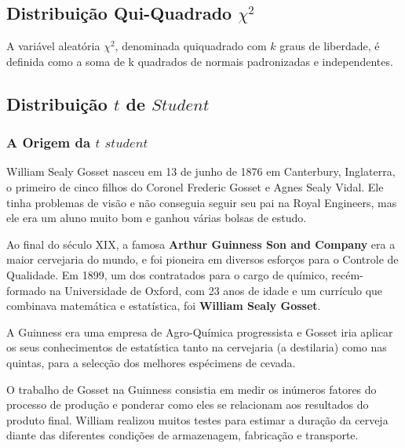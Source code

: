 \newpage
\subsection{Distribuição Qui-Quadrado $\chi^{2}$}

\inic A variável aleatória $\chi^{2}$, denominada quiquadrado com $k$ graus de liberdade, é definida como a soma de k quadrados de normais padronizadas e independentes. 


\newpage
\subsection{Distribuição $t$ de $Student$}
\subsubsection{A Origem da $t$ $student$}

William Sealy Gosset nasceu em 13 de junho de 1876 em Canterbury, Inglaterra, o primeiro de cinco filhos do Coronel Frederic Gosset e Agnes Sealy Vidal. Ele tinha problemas de visão e não conseguia seguir seu pai na Royal Engineers, mas ele era um aluno muito bom e ganhou várias bolsas de estudo.\vskip0.3cm


Ao final do século XIX, a famosa \textbf{Arthur Guinness Son and Company} era a maior cervejaria do mundo, e foi pioneira em diversos esforços para o Controle de Qualidade. Em 1899, um dos contratados para o cargo de químico, recém-formado na Universidade de Oxford, com 23 anos de idade e um currículo que combinava matemática e estatística, foi \textbf{William Sealy Gosset}.\vskip0.3cm



A Guinness era uma empresa de Agro-Química progressista e Gosset iria aplicar os seus conhecimentos de estatística tanto na cervejaria (a destilaria) como nas quintas, para a selecção dos melhores espécimens de cevada.\vskip0.3cm

O trabalho de Gosset na Guinness consistia em medir os inúmeros fatores do processo de produção e ponderar como eles se relacionam aos resultados do produto final. William realizou muitos testes para estimar a duração da cerveja diante das diferentes condições de armazenagem, fabricação e transporte.\vskip0.3cm


